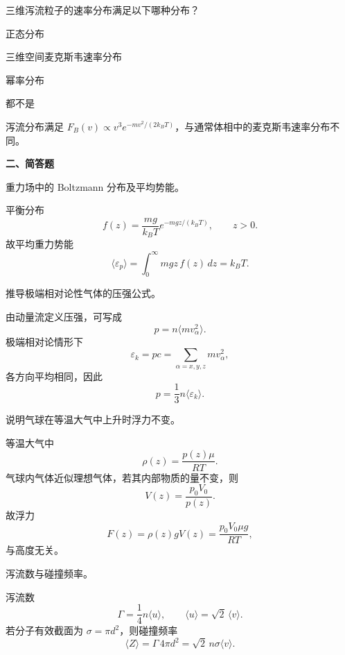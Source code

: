 \begin{question}
三维泻流粒子的速率分布满足以下哪种分布？
\begin{choiceoptions}
\item 正态分布
\item 三维空间麦克斯韦速率分布
\item 幂率分布
\item 都不是
\end{choiceoptions}
\begin{solution}
泻流分布满足 $F_B(v)\propto v^3e^{-mv^2/(2k_BT)}$，与通常体相中的麦克斯韦速率分布不同。
\end{solution}
\end{question}

\textbf{二、简答题}
\begin{question}
重力场中的 Boltzmann 分布及平均势能。
\begin{solution}
平衡分布
\[
f(z)=\frac{mg}{k_BT}e^{-mgz/(k_BT)},\qquad z>0.
\]
故平均重力势能
\[
\langle \varepsilon_p\rangle=\int_0^{\infty} mgz\,f(z)\,dz=k_BT.
\]
\end{solution}
\end{question}

\begin{question}
推导极端相对论性气体的压强公式。
\begin{solution}
由动量流定义压强，可写成
\[
p=n\langle mv_\alpha^2\rangle.
\]
极端相对论情形下
\[
\varepsilon_k=pc=\sum_{\alpha=x,y,z}mv_\alpha^2,
\]
各方向平均相同，因此
\[
p=\frac13 n\langle \varepsilon_k\rangle.
\]
\end{solution}
\end{question}

\begin{question}
说明气球在等温大气中上升时浮力不变。
\begin{solution}
等温大气中
\[
\rho(z)=\frac{p(z)\mu}{RT}.
\]
气球内气体近似理想气体，若其内部物质的量不变，则
\[
V(z)=\frac{p_0V_0}{p(z)}.
\]
故浮力
\[
F(z)=\rho(z)gV(z)=\frac{p_0V_0\mu g}{RT},
\]
与高度无关。
\end{solution}
\end{question}

\begin{question}
泻流数与碰撞频率。
\begin{solution}
泻流数
\[
\Gamma=\frac14 n\langle u\rangle,
\qquad \langle u\rangle=\sqrt2\,\langle v\rangle.
\]
若分子有效截面为 $\sigma=\pi d^2$，则碰撞频率
\[
\langle Z\rangle=\Gamma\,4\pi d^2
=\sqrt2\,n\sigma\langle v\rangle.
\]
\end{solution}
\end{question}


